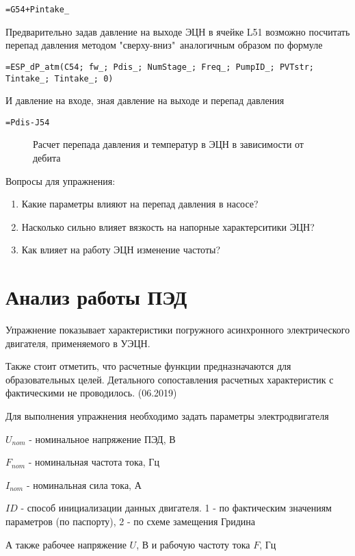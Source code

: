 { \small  \texttt{=G54+Pintake\_}}

Предварительно задав давление на выходе ЭЦН в ячейке L51 возможно посчитать перепад давления методом "сверху-вниз"\ аналогичным образом по формуле

{ \small  \texttt{=ESP\_dP\_atm(C54; fw\_; Pdis\_; NumStage\_; Freq\_; PumpID\_; PVTstr; Tintake\_; Tintake\_; 0)}}

И давление на входе, зная давление на выходе и перепад давления

{ \small  \texttt{=Pdis-J54}}

\begin{figure}[h!]
	\center{\texttt{[image: Ex70\_4]}}
	\caption{Расчет перепада давления и температур в ЭЦН в зависимости от дебита}
	\label{ris:Ex70_4}
\end{figure}

Вопросы для упражнения:

\begin{enumerate}
	\item Какие параметры влияют на перепад давления в насосе?
	\item Насколько сильно влияет вязкость на напорные характерситики ЭЦН?
	\item Как влияет на работу ЭЦН изменение частоты?
\end{enumerate}


\section{Анализ работы ПЭД}

Упражнение показывает характеристики погружного асинхронного электрического двигателя, применяемого в УЭЦН.

Также стоит отметить, что расчетные функции предназначаются для образовательных целей. Детального сопоставления расчетных характеристик с фактическими не проводилось. (06.2019)

Для выполнения упражнения необходимо задать параметры электродвигателя

$U_{nom}$ - номинальное напряжение ПЭД, В

$F_{nom}$ - номинальная частота тока, Гц

$I_{nom}$ - номинальная сила тока, А

$ID$ - способ инициализации данных двигателя. 1 - по фактическим значениям параметров (по паспорту), 2 - по схеме замещения Гридина

А также рабочее напряжение $U$, В и рабочую частоту тока $F$, Гц

